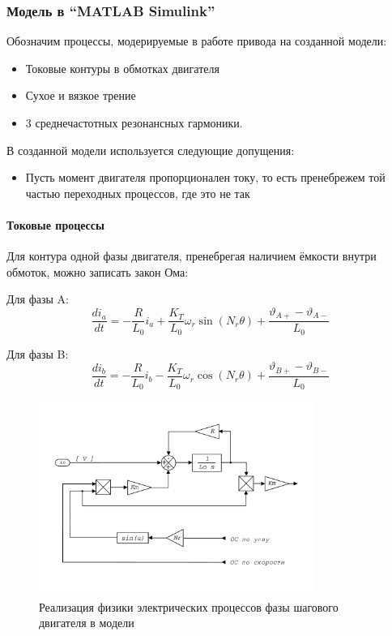 \subsubsection{Модель в ``MATLAB Simulink''}
Обозначим процессы, модерируемые в работе привода на созданной модели:

\begin{itemize}
    \item Токовые контуры в обмотках двигателя
    \item Сухое и вязкое трение
    \item 3 среднечастотных резонансных гармоники. %
\end{itemize}

В созданной модели используется следующие допущения:

\begin{itemize}
    \item Пусть момент двигателя пропорционален току, то есть пренебрежем той частью переходных
            процессов, где это не так
\end{itemize}

\paragraph{ Токовые процессы }
Для контура одной фазы двигателя, пренебрегая наличием ёмкости внутри обмоток, можно записать
закон Ома:

Для фазы A:
\begin{equation}
    \frac{di_{a}}{dt} =
        - \frac{R}{L_{0}} i_{a}
        + \frac{K_{T}}{L_{0}} \omega_{r} \sin(N_{r}\theta)
        + \frac{\vartheta_{A+} - \vartheta_{A-}}{L_{0}}
\end{equation}

Для фазы B:
\begin{equation}
    \frac{di_{b}}{dt} =
        - \frac{R}{L_{0}} i_{b}
        - \frac{K_{T}}{L_{0}} \omega_{r} \cos(N_{r}\theta)
        + \frac{\vartheta_{B+} - \vartheta_{B-}}{L_{0}}
\end{equation}
\begin{figure}[ht!]
    \centering
    \includegraphics[width=0.8\textwidth, keepaspectratio]
                    {./src/pictures/drive_model/drive_model_current_equation}
    \caption{Реализация физики электрических процессов фазы шагового двигателя в модели}
    \label{pic_drive_model_current_equation}
\end{figure}

